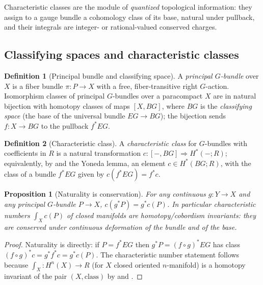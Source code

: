 \documentclass[12pt]{article}
\newtheorem{proposition}[proposition]{Proposition}
\theoremstyle{definition}
\newtheorem{definition}[definition]{Definition}
\theoremstyle{remark}
\begin{document}
Characteristic classes are the module of \emph{quantized} topological information:
they assign to a gauge bundle a cohomology class of its base, natural under
pullback, and their integrals are integer- or rational-valued conserved charges.

\subsection{Classifying spaces and characteristic classes}

\begin{definition}[Principal bundle and classifying space]
\label{def:bundle}
A \emph{principal $G$-bundle} over $X$ is a fiber bundle $\pi\colon P\to X$ with a
free, fiber-transitive right $G$-action. Isomorphism classes of principal
$G$-bundles over a paracompact $X$ are in natural bijection with homotopy classes
of maps $[X,BG]$, where $BG$ is the \emph{classifying space} (the base of the
universal bundle $EG\to BG$); the bijection sends $f\colon X\to BG$ to the
pullback $f^*EG$.
\end{definition}

\begin{definition}[Characteristic class]
\label{def:charclass}
A \emph{characteristic class} for $G$-bundles with coefficients in $R$ is a natural
transformation $c\colon [-,BG]\Rightarrow H^*(-;R)$; equivalently, by
 and the Yoneda lemma, an element $c\in H^*(BG;R)$, with the
class of a bundle $f^*EG$ given by $c(f^*EG)=f^*c$.
\end{definition}

\begin{proposition}[Naturality is conservation]
\label{prop:char-nat}
For any continuous $g\colon Y\to X$ and any principal $G$-bundle $P\to X$,
$c(g^*P)=g^*c(P)$. In particular characteristic numbers $\int_X c(P)$ of closed
manifolds are homotopy/cobordism invariants: they are conserved under continuous
deformation of the bundle and of the base.
\end{proposition}

\begin{proof}
Naturality is  directly: if $P=f^*EG$ then
$g^*P=(f\circ g)^*EG$ has class $(f\circ g)^*c=g^*f^*c=g^*c(P)$. The characteristic
number statement follows because $\int_X\colon H^n(X)\to R$ (for $X$ closed
oriented $n$-manifold) is a homotopy invariant of the pair $(X,\text{class})$ by
 and .
\end{proof}
\end{document}
